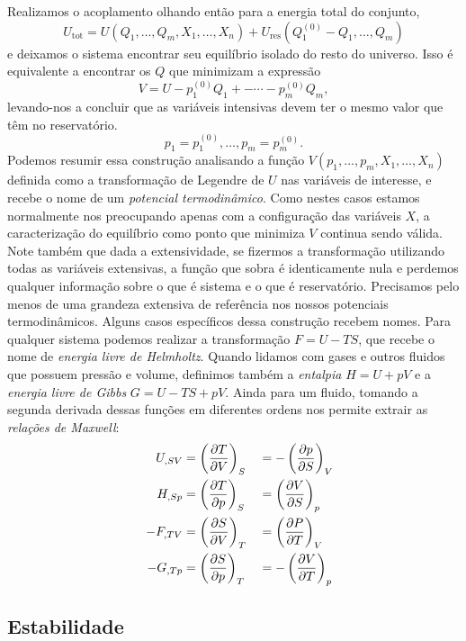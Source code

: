 Realizamos o acoplamento olhando então para a energia total do conjunto,
$$U_\text{tot}=U(Q_1,\dots,Q_m,X_1,\dots,X_n)
+U_\text{res}(Q^{(0)}_1-Q_1,\dots,Q_m)$$
e deixamos o sistema encontrar seu equilíbrio isolado do resto do universo. Isso
é equivalente a encontrar os $Q$ que minimizam a expressão
$$V=U-p^{(0)}_1Q_1+-\cdots-p^{(0)}_mQ_m,$$
levando-nos a concluir que as variáveis intensivas devem ter o mesmo valor que
têm no reservatório.
$$p_1=p^{(0)}_1,\dots,p_m=p^{(0)}_m.$$
Podemos resumir essa construção analisando a função $V(p_1,\dots,p_m,X_1,\dots,
X_n)$ definida como a transformação de Legendre de $U$ nas variáveis de
interesse, e recebe o nome de um \emph{potencial termodinâmico}. Como nestes
casos estamos normalmente nos preocupando apenas com a configuração das
variáveis $X$, a caracterização do equilíbrio como ponto que minimiza $V$
continua sendo válida. Note também que dada a extensividade, se fizermos a
transformação utilizando todas as variáveis extensivas, a função que sobra é
identicamente nula e perdemos qualquer informação sobre o que é sistema e o que
é reservatório. Precisamos pelo menos de uma grandeza extensiva de referência
nos nossos potenciais termodinâmicos. Alguns casos específicos dessa construção
recebem nomes. Para qualquer sistema podemos realizar a transformação $F=U-TS$,
que recebe o nome de \emph{energia livre de Helmholtz}. Quando lidamos com gases
e outros fluidos que possuem pressão e volume, definimos também a \emph{
entalpia} $H=U+pV$ e a \emph{energia livre de Gibbs} $G=U-TS+pV$. Ainda para um
fluido, tomando a segunda derivada dessas funções em diferentes ordens
nos permite extrair as \emph{relações de Maxwell}:
\begin{alignat*}{3}
    &&U_{,SV}&=\pd{T}{V}{S}&&=-\pd{p}{S}{V}\\
    &&H_{,Sp}&=\pd{T}{p}{S}&&=\pd{V}{S}{p}\\
    &&-F_{,TV}&=\pd{S}{V}{T}&&=\pd{P}{T}{V}\\
    &&-G_{,Tp}&=\pd{S}{p}{T}&&=-\pd{V}{T}{p}
\end{alignat*}

\subsection{Estabilidade}

